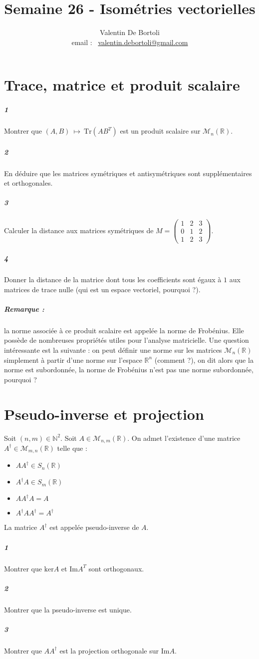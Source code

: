 \documentclass[10pt,a4paper]{article}
\title{Semaine 26 - Isométries vectorielles}
\author{Valentin De Bortoli \\ email : \ \href{mailto:valentin.debortoli@gmail.com}{valentin.debortoli@gmail.com}}
\date{}
\begin{document}
\maketitle
\section{Trace, matrice et  produit scalaire}
\subparagraph{1}Montrer que $(A,B) \ \mapsto \ \text{Tr}(AB^T)$ est un produit scalaire sur $\mathcal{M}_n \left( \mathbb{R} \right)$.
\subparagraph{2}En déduire que les matrices symétriques et antisymétriques sont supplémentaires et orthogonales.
\subparagraph{3}Calculer la distance aux matrices symétriques de $M = \left( \begin{matrix} 1 & 2 & 3  \\ 0 & 1 & 2 \\ 1 & 2 & 3 \end{matrix} \right)$.
\subparagraph{4}Donner la distance de la matrice dont tous les coefficients sont égaux à $1$ aux matrices de trace nulle (qui est un espace vectoriel, pourquoi ?).
\subparagraph{Remarque :} la norme associée à ce produit scalaire est appelée la norme de Frobénius. Elle possède de nombreuses propriétés utiles pour l'analyse matricielle. Une question intéressante est la suivante : on peut définir une norme sur les matrices $\mathcal{M}_n\left( \mathbb{R} \right)$ simplement à partir d'une norme sur l'espace $\mathbb{R}^n$ (comment ?), on dit alors que la norme est subordonnée, la norme de Frobénius n'est pas une norme subordonnée, pourquoi ?
\section{Pseudo-inverse et projection}
Soit $(n,m) \in \mathbb{N}^2$. Soit $A \in \mathcal{M}_{n,m} \left( \mathbb{R} \right)$. On admet l'existence d'une matrice $A^{\dag} \in \mathcal{M}_{m,n} \left( \mathbb{R} \right)$ telle que :
\begin{itemize}
\item $AA^{\dag} \in S_n\left( \mathbb{R} \right)$
\item $A^{\dag}A \in S_m \left( \mathbb{R} \right)$
\item $AA^{\dag}A=A$
\item $A^{\dag}AA^{\dag} =A^{\dag}$
\end{itemize}
La matrice $A^{\dag}$ est appelée pseudo-inverse de $A$.
\subparagraph{1}Montrer que $\text{ker}A$ et $\text{Im}A^T$ sont orthogonaux.
\subparagraph{2}Montrer que la pseudo-inverse est unique.
\subparagraph{3}Montrer que $AA^{\dag}$ est la projection orthogonale sur $\text{Im}A$.
\end{document}
